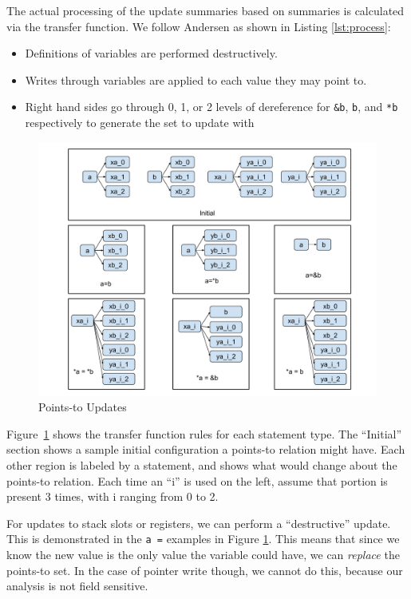 The actual processing of the update summaries based on summaries is calculated via the transfer function.
We follow Andersen as shown in Listing \ref{lst:process}:
\begin{itemize}
\item Definitions of variables are performed destructively.
\item Writes through variables are applied to each value they may point to.
\item Right hand sides go through 0, 1, or 2 levels of dereference for \texttt{\&b}, \texttt{b}, and \texttt{*b} respectively to generate the set to update with
\end{itemize}

\begin{figure}
	\centering
	\includegraphics[scale=0.35]{alias/pts-update.pdf}
	\caption{Points-to Updates}
	\label{fig:pts-update}
\end{figure}

Figure~\ref{fig:pts-update} shows the transfer function rules for each
statement type.
The ``Initial'' section shows a sample initial configuration a points-to relation might have.
Each other region is labeled by a statement, and shows what would change about the points-to relation.
Each time an ``i'' is used on the left, assume that portion is present 3 times, with i ranging from 0 to 2.

For updates to stack slots or registers, we can perform a ``destructive'' update.
This is demonstrated in the \texttt{a =} examples in Figure \ref{fig:pts-update}.
This means that since we know the new value
is the only value the variable could have, we can \emph{replace} the
points-to set.  In the case of pointer write though, we cannot do
this, because our analysis is not field sensitive.

